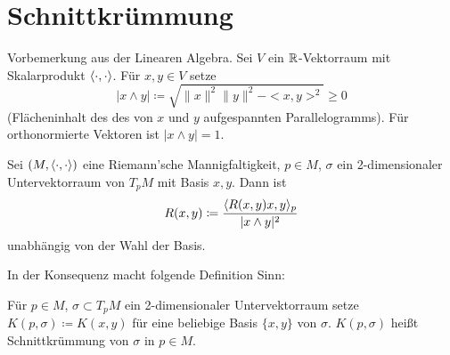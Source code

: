 \documentclass[a4paper,twoside,DIV15,BCOR12mm]{scrbook}
\renewcommand{\da}{\coloneqq}
\begin{document}
\section{Schnittkrümmung}

Vorbemerkung aus der Linearen Algebra. Sei $V$ ein $\mathbb{R}$-Vektorraum mit Skalarprodukt $\langle\cdot,\cdot\rangle$. Für $x,y\in V$ setze 
\[
| x \wedge y| \da \sqrt{\|x\|^2 \|y\|^2 - <x,y>^2} \ge 0
\]
(Flächeninhalt des des von $x$ und $y$ aufgespannten Parallelogramms). Für orthonormierte Vektoren ist $|x\wedge y| = 1$.

\begin{lemma}
Sei $(M,\langle\cdot,\cdot\rangle)$ eine Riemann’sche Mannigfaltigkeit, $p\in M$, $\sigma$ ein 2-dimensionaler Untervektorraum von $T_pM$ mit Basis $x,y$. Dann ist 
\[
R(x,y) \da \frac{\ksp {R(x,y)x} y_p}{|x\wedge y|^2}
\] unabhängig von der Wahl der Basis.
\end{lemma}

In der Konsequenz macht folgende Definition Sinn:
\begin{definition}
Für $p\in M$, $\sigma \subset T_pM$ ein 2-dimensionaler Untervektorraum setze $K(p,\sigma) \da K(x,y)$ für eine beliebige Basis $\{x,y\}$ von $\sigma$. $K(p,\sigma)$ heißt Schnittkrümmung von $\sigma$ in $p\in M$.
\end{definition}
\end{document}
